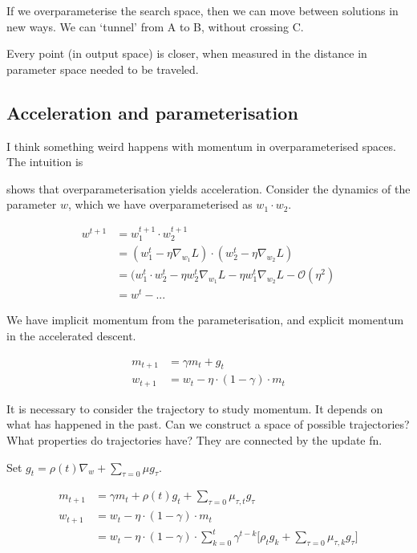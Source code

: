 If we overparameterise the search space, then we can move between solutions in new ways. We can `tunnel' from A to B, without crossing C.

Every point (in output space) is closer, when measured in the distance in parameter space needed to be traveled.

\subsection{Acceleration and parameterisation}

I think something weird happens with momentum in overparameterised spaces. The intuition is

\cite{Arora2018} shows that overparameterisation yields acceleration. Consider
the dynamics of the parameter $w$, which we have overparameterised as $w_1 \cdot w_2$.

\begin{align}
w^{t+1} &= w_1^{t+1} \cdot w_2^{t+1} \\
&= (w_1^t - \eta \nabla_{w_1} L)\cdot(w_2^t - \eta \nabla_{w_2} L) \\
&= (w_1^t \cdot w_2^t - \eta w_2^t \nabla_{w_1} L - \eta w_1^t \nabla_{w_2} L - \mathcal O(\eta^2) \\
&= w^t - ...
\end{align}

We have implicit momentum from the parameterisation, and explicit momentum in the accelerated descent.


\begin{align}
m_{t+1} &= \gamma m_t + g_t \\
w_{t+1} &= w_t - \eta \cdot (1-\gamma) \cdot m_t
\end{align}

It is necessary to consider the trajectory to study momentum. It depends
on what has happened in the past. Can we construct a space of possible
trajectories? What properties do trajectories have? They are connected
by the update fn.

Set $g_t = \rho(t) \nabla_w + \sum_{\tau=0} \mu g_{\tau}$.

\begin{align}
m_{t+1} &= \gamma m_t + \rho(t) g_t + \sum_{\tau=0} \mu_{\tau, t} g_{\tau} \\
w_{t+1} &= w_t - \eta \cdot (1-\gamma) \cdot m_t \\
&= w_t - \eta \cdot (1-\gamma) \cdot \sum_{k=0}^t \gamma^{t-k}\big[ \rho_t g_k + \sum_{\tau=0} \mu_{\tau, k} g_{\tau} \big]
\end{align}

